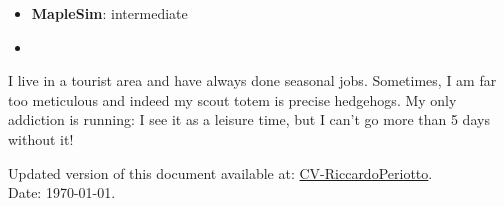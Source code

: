 \documentclass[11 pt,oneside,a4paper,titlepage]{article}
\begin{document}
{\begin{minipage}{11.3cm}
\begin{multicols}{2}
\begin{itemize}
            \item \textbf{MapleSim}: intermediate
            \item[\vspace{\fill}]
        \end{itemize}
        \end{multicols}
        
        

        I live in a tourist area and have always done seasonal jobs. Sometimes, I am far too meticulous and indeed my scout totem is precise hedgehogs. My only addiction is running: I see it as a leisure time, but I can't go more than 5 days without it!
        
        \vspace*{0.22cm}
        Updated version of this document available at: \href{https://riccardoperiotto.github.io/CurriculumVitae/CV-RiccardoPeriotto.pdf}{CV-RiccardoPeriotto}. \\
        Date: \today.
    \end{minipage}} %
\end{document}
